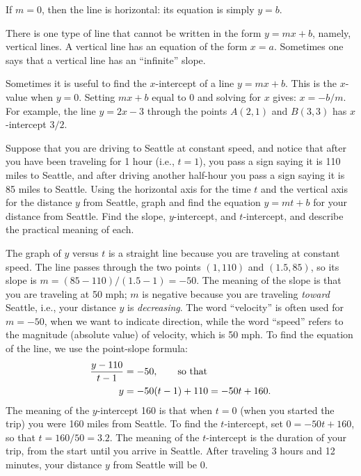 If $m=0$, then the line is horizontal: its equation is simply $y=b$.


There is one type of line that cannot be written in the form $y=mx+b$,
namely, vertical lines.  A vertical line has an equation of the form $x=a$.
Sometimes one says that a vertical line has an ``infinite'' slope.


Sometimes it is useful to find the $x$-intercept of a line $y=mx+b$.  This is
the $x$-value when $y=0$.  Setting $mx+b$ equal to 0 and solving for
$x$ gives: $x=-b/m$.  For example, the line $y=2x-3$ through the points
$A(2,1)$ and $B(3,3)$ has $x$-intercept $3/2$.


\begin{example} Suppose that you are driving to Seattle at constant speed, and
notice that after you have been traveling for 1 hour (i.e., $t=1$),
you pass a sign saying it is 110 miles to Seattle, and after driving
another half-hour you pass a sign saying it is 85 miles to Seattle.  Using
the horizontal axis for the time $t$ and the vertical axis for the
distance $y$ from Seattle, graph and find the equation $y=mt+b$ for
your distance from Seattle.  Find the slope, $y$-intercept, and
$t$-intercept, and describe the practical meaning of each.

The graph of $y$ versus $t$ is a straight line because you are traveling
at constant speed.  The line passes through the two points $(1,110)$ and
$(1.5,85)$, so its slope is $m=(85-110)/(1.5-1)=-50$.  The meaning of the
slope is that you are traveling at 50 mph; $m$ is negative because you are
traveling {\it toward\/} Seattle, i.e., your distance $y$ is {\it
decreasing}.  The word ``velocity'' is often used for $m=-50$, when we want
to indicate direction, while the word ``speed'' refers to the magnitude
(absolute value) of velocity, which is 50 mph.  To find the equation of the
line, we use the point-slope formula:
\begin{align*}
    {y-110\over t-1}&=-50,\qquad\hbox{so~that} \\
    y&=-50(t-1)+110=-50t+160.
\end{align*}
The meaning of the $y$-intercept 160 is that when $t=0$ (when you
started the trip) you were 160 miles from Seattle.  To find the
$t$-intercept, set $0=-50t+160$, so that $t=160/50=3.2$.  The meaning
of the $t$-intercept is the duration of your trip, from the start
until you arrive in Seattle.
After traveling 3 hours and 12 minutes, your distance $y$ from Seattle will be
0.  
\label{example:drive to Seattle}
\end{example} 

